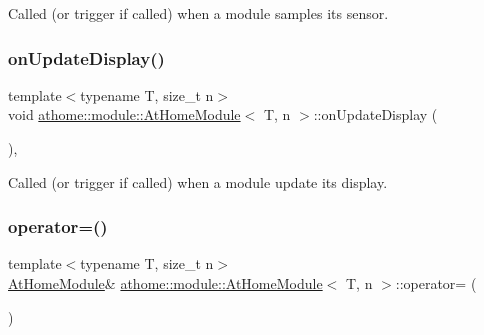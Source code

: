 Called (or trigger if called) when a module samples its sensor. \mbox{\label{classathome_1_1module_1_1_at_home_module_a78fdbc14589f82531bd08baeb2e3cfb1}} 
\subsubsection{\texorpdfstring{on\+Update\+Display()}{onUpdateDisplay()}}
{\footnotesize\ttfamily template$<$typename T, size\+\_\+t n$>$ \\
void \mbox{\hyperlink{classathome_1_1module_1_1_at_home_module}{athome\+::module\+::\+At\+Home\+Module}}$<$ T, n $>$\+::on\+Update\+Display (\begin{DoxyParamCaption}{ }\end{DoxyParamCaption})\hspace{0.3cm}{\ttfamily [inline]}, {\ttfamily [protected]}}

Called (or trigger if called) when a module update its display. \mbox{\label{classathome_1_1module_1_1_at_home_module_aec07a48057f5d52c9adaea375a6a7ad4}} 
\subsubsection{\texorpdfstring{operator=()}{operator=()}}
{\footnotesize\ttfamily template$<$typename T, size\+\_\+t n$>$ \\
\mbox{\hyperlink{classathome_1_1module_1_1_at_home_module}{At\+Home\+Module}}\& \mbox{\hyperlink{classathome_1_1module_1_1_at_home_module}{athome\+::module\+::\+At\+Home\+Module}}$<$ T, n $>$\+::operator= (\begin{DoxyParamCaption}\item[{const \mbox{\hyperlink{classathome_1_1module_1_1_at_home_module}{At\+Home\+Module}}$<$ T, n $>$ \&}]{ }\end{DoxyParamCaption})\hspace{0.3cm}{\ttfamily [delete]}}

